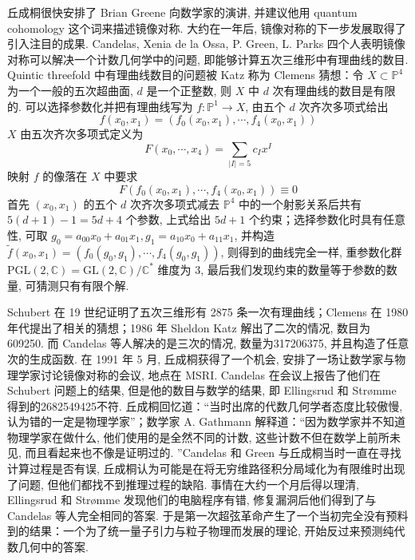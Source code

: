 \documentclass[10pt]{article}
\numberwithin{equation}{section}
\begin{document}
丘成桐很快安排了 Brian Greene 向数学家的演讲, 并建议他用 quantum cohomology 这个词来描述镜像对称. 大约在一年后, 镜像对称的下一步发展取得了引入注目的成果. Candelas, Xenia de la Ossa, P. Green, L. Parks 四个人表明镜像对称可以解决一个计数几何学中的问题, 即能够计算五次三维形中有理曲线的数目\cite{CandelasDeLaOssaGreenParkes1991}. Quintic threefold 中有理曲线数目的问题被 Katz 称为 Clemens 猜想：令 $X\subset \mathbb{P}^4$ 为一个一般的五次超曲面, $d$ 是一个正整数, 则 $X$ 中 $d$ 次有理曲线的数目是有限的\cite{Katz1986}. 可以选择参数化并把有理曲线写为 $f:\mathbb{P}^1\to X$, 由五个 $d$ 次齐次多项式给出
\begin{equation}
f(x_{0},x_{1})=(f_{0}(x_{0},x_{1}),\cdots,f_{4}(x_{0},x_{1}))
\end{equation}
$X$ 由五次齐次多项式定义为
\begin{equation}
F(x_{0},\cdots,x_{4})=\sum_{|I|=5}c_{I}x^I
\end{equation}
映射 $f$ 的像落在 $X$ 中要求
\begin{equation}
F(f_{0}(x_{0},x_{1}),\cdots,f_{4}(x_{0},x_{1}))\equiv 0
\end{equation}
首先 $(x_{0},x_{1})$ 的五个 $d$ 次齐次多项式减去 $\mathbb{P}^4$ 中的一个射影关系后共有 $5(d+1)-1=5d+4$ 个参数, 上式给出 $5d+1$ 个约束；选择参数化时具有任意性, 可取 $g_{0}=a_{00}x_{0}+a_{01}x_{1},g_{1}=a_{10}x_{0}+a_{11}x_{1}$, 并构造 $\tilde{f}(x_{0},x_{1})=(f_{0}(g_{0},g_{1}),\cdots,f_{4}(g_{0},g_{1}))$, 则得到的曲线完全一样, 重参数化群 $\mathrm{PGL}(2,\mathbb{C})=\mathrm{GL}(2,\mathbb{C}) /\mathbb{C}^*$ 维度为 $3$, 最后我们发现约束的数量等于参数的数量, 可猜测只有有限个解. 

Schubert 在 19 世纪证明了五次三维形有 2875 条一次有理曲线；Clemens 在 1980 年代提出了相关的猜想；1986 年 Sheldon Katz 解出了二次的情况, 数目为 609250. 而 Candelas 等人解决的是三次的情况, 数量为317206375, 并且构造了任意次的生成函数. 在 1991 年 5 月, 丘成桐获得了一个机会, 安排了一场让数学家与物理学家讨论镜像对称的会议, 地点在 MSRI. Candelas 在会议上报告了他们在 Schubert 问题上的结果, 但是他的数目与数学的结果, 即 Ellingsrud 和 Strømme 得到的2682549425不符. 丘成桐回忆道：“当时出席的代数几何学者态度比较傲慢, 认为错的一定是物理学家”；数学家 A. Gathmann 解释道：“因为数学家并不知道物理学家在做什么, 他们使用的是全然不同的计数, 这些计数不但在数学上前所未见, 而且看起来也不像是证明过的. ”Candelas 和 Green 与丘成桐当时一直在寻找计算过程是否有误, 丘成桐认为可能是在将无穷维路径积分局域化为有限维时出现了问题, 但他们都找不到推理过程的缺陷. 事情在大约一个月后得以理清, Ellingsrud 和 Strømme 发现他们的电脑程序有错, 修复漏洞后他们得到了与 Candelas 等人完全相同的答案. 于是第一次超弦革命产生了一个当初完全没有预料到的结果：一个为了统一量子引力与粒子物理而发展的理论, 开始反过来预测纯代数几何中的答案\cite{CandelasDeLaOssaGreenParkes1991,Morrison1993,EllingsrudStromme1995,EllingsrudStromme1996}. 
\end{document}
